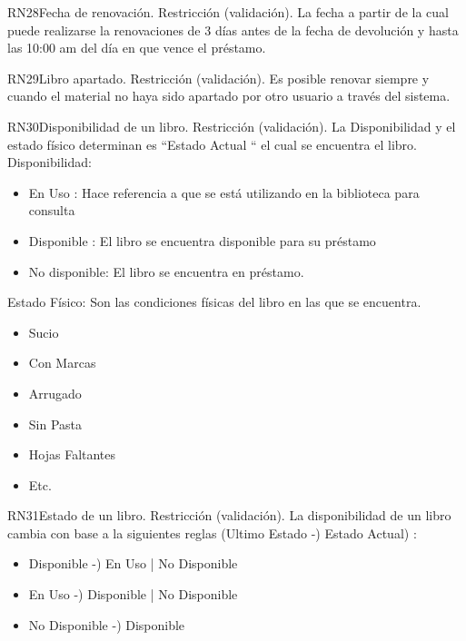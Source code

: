 \begin{BussinesRule}{RN28}{Fecha de renovación.} 
	\BRitem[Tipo:] Restricción (validación).
	\BRitem[Descripción:]La fecha a partir de la cual puede realizarse la renovaciones de 3 días antes de la fecha de devolución y hasta las 10:00 am del día en que vence el préstamo.
\end{BussinesRule}

\begin{BussinesRule}{RN29}{Libro apartado.} 
	\BRitem[Tipo:] Restricción (validación).
	\BRitem[Descripción:]Es posible renovar siempre y cuando el material no haya sido apartado por otro usuario a través del sistema.
\end{BussinesRule}


\begin{BussinesRule}{RN30}{Disponibilidad de un libro.} 
	\BRitem[Tipo:] Restricción (validación).
	\BRitem[Descripción:]La Disponibilidad y el estado físico  determinan es “Estado Actual “ el cual se encuentra el libro.
Disponibilidad:

		\begin{itemize} 
			\item En Uso : Hace referencia a  que se está utilizando en la biblioteca para consulta
			\item Disponible : El libro se encuentra disponible para su préstamo
			\item No disponible: El libro se encuentra en préstamo.
		\end{itemize}
Estado Físico: Son las condiciones físicas del libro en las que se encuentra.
	\begin{itemize} 
			\item Sucio
			\item Con Marcas 
			\item Arrugado
			\item Sin Pasta
			\item Hojas Faltantes
			\item Etc.
		\end{itemize}

	
\end{BussinesRule}

\begin{BussinesRule}{RN31}{Estado de un libro.} 
	\BRitem[Tipo:] Restricción (validación).
	\BRitem[Descripción:]La disponibilidad de un libro cambia con base a la siguientes reglas (Ultimo Estado -)  Estado Actual) :
\begin{itemize} 
			\item Disponible -)  En Uso | No Disponible
			\item En Uso -) Disponible | No Disponible
			\item No Disponible -) Disponible
		\end{itemize}
\end{BussinesRule}




